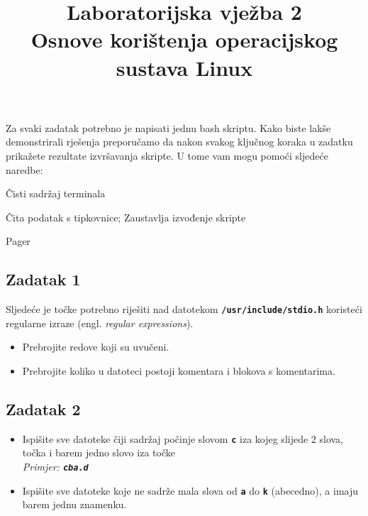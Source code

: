 \documentclass[12pt,a4paper]{article}
\newcommand{\shell}[1]{\texttt{\textbf{#1}}}
\begin{document}
	\title{Laboratorijska vježba 2\\{\small Osnove korištenja operacijskog sustava Linux}\vspace{-2em}}
	\maketitle
	Za svaki zadatak potrebno je napisati jednu bash skriptu. Kako biste lakše demonstrirali rješenja preporučamo da nakon svakog ključnog koraka u zadatku prikažete rezultate izvršavanja skripte. U tome vam mogu pomoći sljedeće naredbe:
	\begin{description}[leftmargin=!,labelwidth=4em,itemsep=0em]
		\item[\shell{clear}] Čisti sadržaj terminala
		\item[\shell{read -p}] Čita podatak s tipkovnice; Zaustavlja izvođenje skripte
		\item[\shell{less}] Pager
	\end{description}

	\subsection*{Zadatak 1}
	Sljedeće je točke potrebno riješiti nad datotekom \shell{/usr/include/stdio.h} koristeći regularne izraze (engl. \textit{regular expressions}).
	\begin{itemize}
		\item Prebrojite redove koji su uvučeni.
		\item Prebrojite koliko u datoteci postoji komentara i blokova s komentarima.
	\end{itemize}

	\subsection*{Zadatak 2}
	\begin{itemize}
		\item Ispišite sve datoteke čiji sadržaj počinje slovom \shell{c} iza kojeg slijede 2 slova, točka i barem jedno slovo iza točke \\ \textit{Primjer: \shell{cba.d} }
		\item Ispišite sve datoteke koje ne sadrže mala slova od \shell{a} do \shell{k} (abecedno), a imaju barem jednu znamenku.
	\end{itemize}
\end{document}
